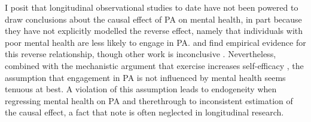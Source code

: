 \documentclass[a4paper,11pt]{report}
\begin{document}
I posit that longitudinal observational studies to date have not been powered to draw conclusions about the causal effect
of PA on mental health, in part because they have not explicitly modelled the reverse effect, namely that individuals with poor
mental health are less likely to engage in PA.
 and  find empirical evidence for this reverse relationship,
though other work is inconclusive \cite{birkeland2009longitudinal, ku2012physical}. Nevertheless, combined with the
mechanistic argument that exercise increases self-efficacy \cite{smith2021role}, the assumption that engagement in PA is
not influenced by mental health seems tenuous at best.
A violation of this assumption leads to endogeneity when regressing mental health on PA and therethrough to
inconsistent estimation of the causal effect, a fact that  note is often neglected in
longitudinal research.
\end{document}
